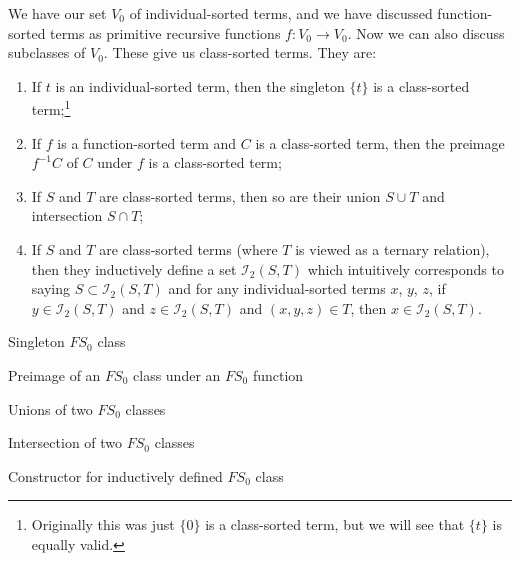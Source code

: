 \begin{node}
We have our set $V_{0}$ of individual-sorted terms, and we have
discussed function-sorted terms as primitive recursive functions
$f\colon V_{0}\to V_{0}$. Now we can also discuss subclasses of
$V_{0}$. These give us class-sorted terms. They are:
\begin{enumerate}
\item If $t$ is an individual-sorted term, then the singleton $\{t\}$
  is a class-sorted term;\footnote{Originally this was just $\{0\}$ is
  a class-sorted term, but we will see that $\{t\}$ is equally valid.}
\item If $f$ is a function-sorted term and $C$ is a class-sorted term,
  then the preimage $f^{-1}C$ of $C$ under $f$ is a class-sorted term;
\item If $S$ and $T$ are class-sorted terms, then so are their union
  $S\cup T$ and intersection $S\cap T$;
\item If $S$ and $T$ are class-sorted terms (where $T$ is viewed as a
  ternary relation), then they inductively define a set
  $\mathcal{I}_{2}(S,T)$ which intuitively corresponds to saying
  $S\subset \mathcal{I}_{2}(S,T)$ and for any individual-sorted terms
  $x$, $y$, $z$, if $y\in\mathcal{I}_{2}(S,T)$ and $z\in\mathcal{I}_{2}(S,T)$
  and $(x,y,z)\in T$, then $x\in\mathcal{I}_{2}(S,T)$.
\end{enumerate}
\end{node}

\nwenddocs{}\endmoddef\nwstartdeflinemarkup{}\nwenddeflinemarkup
\LA{}Singleton $FS_{0}$ class~{\nwtagstyle{}}\RA{}

\LA{}Preimage of an $FS_{0}$ class under an $FS_{0}$ function~{\nwtagstyle{}}\RA{}

\LA{}Unions of two $FS_{0}$ classes~{\nwtagstyle{}}\RA{}

\LA{}Intersection of two $FS_{0}$ classes~{\nwtagstyle{}}\RA{}

\LA{}Constructor for inductively defined $FS_{0}$ class~{\nwtagstyle{}}\RA{}
\nwendcode{}\nwdocspar


